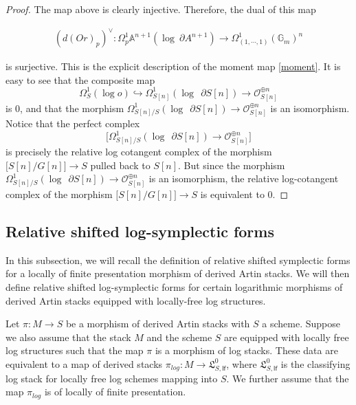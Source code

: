 \documentclass[11pt]{amsart}
\theoremstyle{plain}
\numberwithin{equation}{section}
\theoremstyle{definition}
\theoremstyle{plain}
\begin{document}
\begin{proof}
The map above is clearly injective. Therefore, the dual of this map 

\begin{align}
    (d(Or)_p)^{\vee}: \Omega^1_p \mathbb A^{n+1}(\log~\partial A^{n+1})\longrightarrow \Omega^1_{(1,\cdots, 1)}(\mathbb G_m)^n
\end{align}

is surjective. This is the explicit description of the moment map \ref{moment}. It is easy to see that the composite map
\begin{equation}
\Omega_{S}^{1}(\log o)\hookrightarrow \Omega_{S[n]}^{1}(\log ~~\partial S[n])\longrightarrow \mathcal O_{S[n]}^{\oplus n}
\end{equation}
is $0$, and that the morphism $\Omega_{S[n]/S}^{1}(\log ~~\partial S[n])\longrightarrow \mathcal O_{S[n]}^{\oplus n}$ is an isomorphism.\\

Notice that the perfect complex
\begin{equation}
\big[\Omega_{S[n]/S}^{1}(\log ~~\partial S[n])\longrightarrow \mathcal O_{S[n]}^{\oplus n}\big]
\end{equation}
is precisely the relative log cotangent complex of the morphism $\big[ S[n]/G[n]\big]\longrightarrow S$ pulled back to $S[n]$. But since the morphism $\Omega_{S[n]/S}^{1}(\log ~~\partial S[n])\longrightarrow \mathcal O_{S[n]}^{\oplus n}$ is an isomorphism, the relative log-cotangent complex of the morphism $\big[ S[n]/G[n]\big]\longrightarrow S$ is equivalent to $0$.
\end{proof}

\smallskip

\subsection{\textbf{Relative shifted log-symplectic forms}}
In this subsection, we will recall the definition of relative shifted symplectic forms for a locally of finite presentation morphism of derived Artin stacks. We will then define relative shifted log-symplectic forms for certain logarithmic morphisms of derived Artin stacks equipped with locally-free log structures. 

Let $\pi: M\longrightarrow S$ be a morphism of derived Artin stacks with $S$ a scheme. Suppose we also assume that the stack $M$ and the scheme $S$ are equipped with locally free log structures such that the map $\pi$ is a morphism of log stacks. These data are equivalent to a map of derived  stacks $\pi_{log}: M\longrightarrow \mathfrak L^0_{S,\mathsf{lf}}$, where $\mathfrak L^0_{S,\mathsf{lf}}$ is the classifying log stack for locally free log schemes  mapping into $S$. We further assume that the map $\pi_{log}$ is of locally of finite presentation. 
\end{document}
